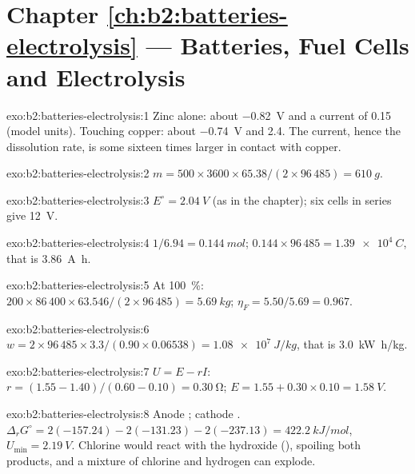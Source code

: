 \section*{Chapter \ref{ch:b2:batteries-electrolysis} --- Batteries, Fuel Cells and Electrolysis}

\begin{solution}{exo:b2:batteries-electrolysis:1}
Zinc alone: about \qty{-0.82}{V} and a current of 0.15 (model units). Touching
copper: about \qty{-0.74}{V} and 2.4. The current, hence the dissolution rate, is
some sixteen times larger in contact with copper.
\end{solution}

\begin{solution}{exo:b2:batteries-electrolysis:2}
$m = 500 \times 3600 \times 65.38/(2 \times 96\,485) = \qty{610}{g}$.
\end{solution}

\begin{solution}{exo:b2:batteries-electrolysis:3}
$E^\circ = \qty{2.04}{V}$ (as in the chapter); six cells in series give
\qty{12}{V}.
\end{solution}

\begin{solution}{exo:b2:batteries-electrolysis:4}
$1/6.94 = \qty{0.144}{mol}$; $0.144 \times 96\,485 = \qty{1.39e4}{C}$, that is
\qty{3.86}{A.h}.
\end{solution}

\begin{solution}{exo:b2:batteries-electrolysis:5}
At 100~\%: $200 \times 86\,400 \times 63.546/(2 \times 96\,485) = \qty{5.69}{kg}$;
$\eta_F = 5.50/5.69 = 0.967$.
\end{solution}

\begin{solution}{exo:b2:batteries-electrolysis:6}
$w = 2 \times 96\,485 \times 3.3/(0.90 \times 0.06538) = \qty{1.08e7}{J/kg}$, that is
\qty{3.0}{kW.h/kg}.
\end{solution}

\begin{solution}{exo:b2:batteries-electrolysis:7}
$U = E - rI$: $r = (1.55 - 1.40)/(0.60 - 0.10) = \qty{0.30}{\ohm}$; $E = 1.55 + 0.30
\times 0.10 = \qty{1.58}{V}$.
\end{solution}

\begin{solution}{exo:b2:batteries-electrolysis:8}
Anode ; cathode . $\Delta_r G^\circ =
2(-157.24) - 2(-131.23) - 2(-237.13) = \qty{422.2}{kJ/mol}$, $U_{\min} =
\qty{2.19}{V}$. Chlorine would react with the hydroxide (), spoiling both products, and a mixture of chlorine and hydrogen
can explode.
\end{solution}


